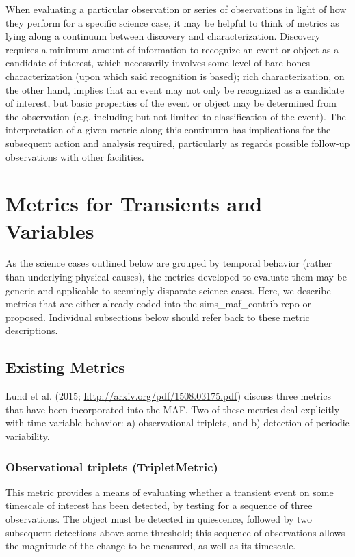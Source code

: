 When evaluating a particular observation or series of observations in light of how they perform for a specific science case, it may be helpful to think of metrics as lying along a continuum between discovery and characterization. Discovery requires a minimum amount of information to recognize an event or object as a candidate of interest, which necessarily involves some level of bare-bones characterization (upon which said recognition is based); rich characterization, on the other hand, implies that an event may not only be recognized as a candidate of interest, but basic properties of the event or object may be determined from the observation (e.g. including but not limited to classification of the event). The interpretation of a given metric along this continuum has implications for the subsequent action and analysis required, particularly as regards possible follow-up observations with other facilities. 


\section{Metrics for Transients and Variables}

As the science cases outlined below are grouped by temporal behavior (rather than underlying physical causes), the metrics developed to evaluate them may be generic and applicable to seemingly disparate science cases. Here, we describe metrics that are either already coded into the sims\_maf\_contrib repo or proposed. Individual subsections below should refer back to these metric descriptions.  


\subsection{Existing Metrics}

Lund et al. (2015; \url{http://arxiv.org/pdf/1508.03175.pdf}) discuss three metrics that have been incorporated into the MAF. Two of these metrics deal explicitly with time variable behavior: a) observational triplets, and b) detection of periodic variability. 

\subsubsection{Observational triplets (TripletMetric)}

This metric provides a means of evaluating whether a transient event on some timescale of interest has been detected, by testing for a sequence of three observations. The object must be detected in quiescence, followed by two subsequent detections above some threshold; this sequence of observations allows the magnitude of the change to be measured, as well as its timescale. 

